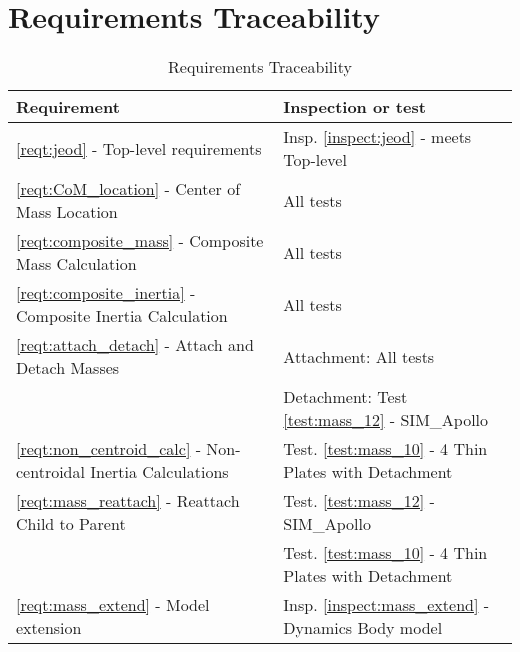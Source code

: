 \section{Requirements Traceability}\label{sec:traceability}
\begin{table}[ht]\label{tab:reqt_ivv_xref}
\begin{tabular}{||p{3.2in}|p{3.2in}|} \hline
{\bf Requirement} & {\bf Inspection or test} \\ \hline \hline
\ref{reqt:jeod} - Top-level requirements &
  Insp. \ref{inspect:jeod} - meets Top-level \\ \hline
\ref{reqt:CoM_location} - Center of Mass Location &
  All tests  \\ \hline
\ref{reqt:composite_mass} - Composite Mass Calculation &
  All tests  \\ \hline
\ref{reqt:composite_inertia} - Composite Inertia Calculation &
  All tests  \\ \hline
\ref{reqt:attach_detach} - Attach and Detach Masses &
  Attachment: All tests \\
& Detachment: Test \ref{test:mass_12} - SIM\_Apollo \\ \hline
\ref{reqt:non_centroid_calc} - Non-centroidal Inertia Calculations &
  Test. \ref{test:mass_10} - 4 Thin Plates with Detachment \\ \hline
\ref{reqt:mass_reattach} - Reattach Child to Parent &
  Test. \ref{test:mass_12} - SIM\_Apollo \\ 
& Test. \ref{test:mass_10} - 4 Thin Plates with Detachment \\ \hline
\ref{reqt:mass_extend} - Model extension &
  Insp. \ref{inspect:mass_extend} - Dynamics Body model \\ \hline
\end{tabular}
\caption{Requirements Traceability}
\end{table}